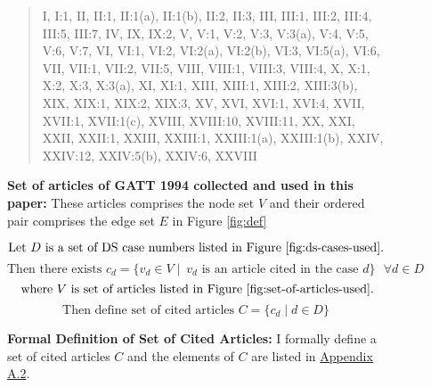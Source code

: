 \begin{figure}[h]
    \begin{quote}
    I, 
    I:1, 
    II, 
    II:1, 
    II:1(a), 
    II:1(b), 
    II:2, 
    II:3, 
    III, 
    III:1, 
    III:2, 
    III:4, 
    III:5, 
    III:7, 
    IV, 
    IX, 
    IX:2, 
    V, 
    V:1, 
    V:2, 
    V:3, 
    V:3(a), 
    V:4, 
    V:5, 
    V:6, 
    V:7, 
    VI, 
    VI:1, 
    VI:2, 
    VI:2(a), 
    VI:2(b), 
    VI:3, 
    VI:5(a), 
    VI:6, 
    VII, 
    VII:1, 
    VII:2, 
    VII:5, 
    VIII, 
    VIII:1, 
    VIII:3, 
    VIII:4, 
    X, 
    X:1, 
    X:2, 
    X:3, 
    X:3(a), 
    XI, 
    XI:1, 
    XIII, 
    XIII:1, 
    XIII:2, 
    XIII:3(b), 
    XIX, 
    XIX:1, 
    XIX:2, 
    XIX:3, 
    XV, 
    XVI, 
    XVI:1, 
    XVI:4, 
    XVII, 
    XVII:1, 
    XVII:1(c), 
    XVIII, 
    XVIII:10, 
    XVIII:11, 
    XX, 
    XXI, 
    XXII, 
    XXII:1, 
    XXIII, 
    XXIII:1, 
    XXIII:1(a), 
    XXIII:1(b), 
    XXIV, 
    XXIV:12, 
    XXIV:5(b), 
    XXIV:6, 
    XXVIII
    \end{quote}
    \caption{
        \textbf{
            Set of articles of GATT 1994 collected and used in this paper: 
            }These articles comprises the node set $V$ and their ordered pair comprises the edge set $E$ in Figure \ref{fig:def}
        }
    \label{fig:set-of-articles-used}
\end{figure}

\begin{figure}[ht]
    \[\text{Let } D \text{ is a set of DS case numbers listed in Figure \ref{fig:ds-cases-used}.} \] %
    \[\text{Then there exists } c_d = \{v_d \in V \mid\ v_d \text{ is an article cited in the case } d\} \text{ } \forall d \in D \]
    \[\text{ where } V \text{ is set of articles listed in Figure \ref{fig:set-of-articles-used}}.\]
    \[\text{Then define set of cited articles } C = \{c_d \mid d \in D\}\]
    \caption{\textbf{Formal Definition of Set of Cited Articles: }I formally define a set of cited articles $C$ and the elements of $C$ are listed in \hyperref[sub:cited-articles-table]{Appendix A.2}.}
    \label{fig:def:set-of-cited-articles}
\end{figure}


